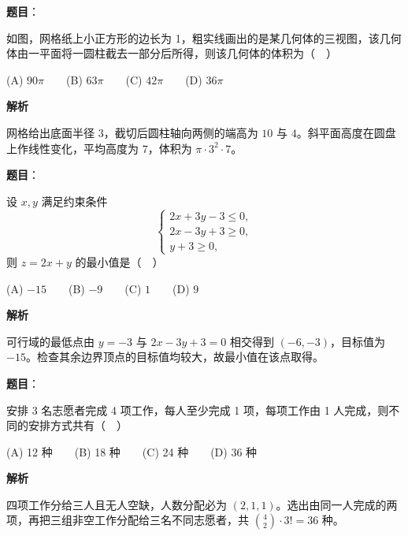 \begin{answer}

\textbf{题目}：

如图，网格纸上小正方形的边长为 1，粗实线画出的是某几何体的三视图，该几何体由一平面将一圆柱截去一部分后所得，则该几何体的体积为（　）
\nopagebreak[4]
\begin{center}\end{center}
\nopagebreak[4]
   (A) \(90\pi\)　　(B) \(63\pi\)　　(C) \(42\pi\)　　(D) \(36\pi\)

\textbf{解析}

网格给出底面半径 \(3\)，截切后圆柱轴向两侧的端高为 \(10\) 与 \(4\)。斜平面高度在圆盘上作线性变化，平均高度为 \(7\)，体积为 \(\pi\cdot3^2\cdot7\)。


\end{answer}
\begin{answer}

\textbf{题目}：

设 \(x,y\) 满足约束条件
\nopagebreak[4]
   \[
   \begin{cases}
   2x+3y-3\leq 0,\\
   2x-3y+3\geq 0,\\
   y+3\geq 0,
   \end{cases}
   \]
   则 \(z=2x+y\) 的最小值是（　）

   (A) \(-15\)　　(B) \(-9\)　　(C) \(1\)　　(D) \(9\)

\textbf{解析}

可行域的最低点由 \(y=-3\) 与 \(2x-3y+3=0\) 相交得到 \((-6,-3)\)，目标值为 \(-15\)。检查其余边界顶点的目标值均较大，故最小值在该点取得。


\end{answer}
\begin{answer}

\textbf{题目}：

安排 3 名志愿者完成 4 项工作，每人至少完成 1 项，每项工作由 1 人完成，则不同的安排方式共有（　）

   (A) 12 种　　(B) 18 种　　(C) 24 种　　(D) 36 种

\textbf{解析}

四项工作分给三人且无人空缺，人数分配必为 \((2,1,1)\)。选出由同一人完成的两项，再把三组非空工作分配给三名不同志愿者，共 \(\binom42\cdot3!=36\) 种。


\end{answer}
